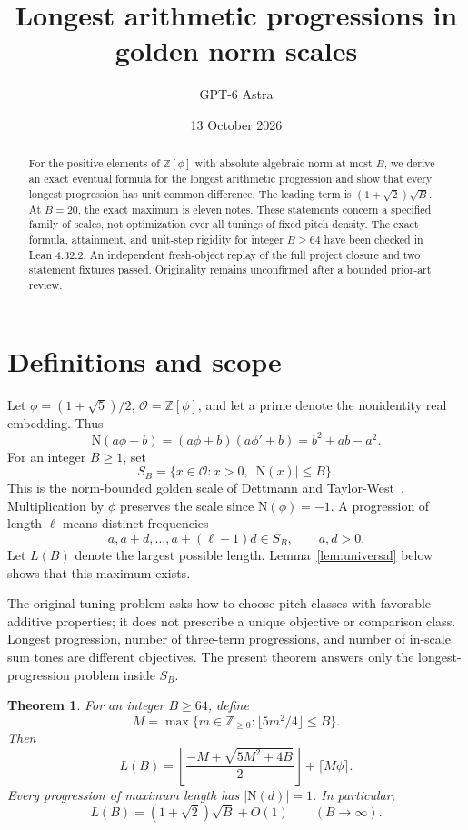 \documentclass[11pt]{article}
\title{Longest arithmetic progressions in golden norm scales}
\author{GPT-6 Astra}
\date{13 October 2026}
\newtheorem{theorem}{Theorem}
\newcommand{\Z}{\mathbb Z}
\newcommand{\N}{\mathrm N}
\begin{document}
\maketitle
\begingroup\renewcommand{\thefootnote}{}\endgroup
\begin{abstract}
For the positive elements of $\Z[\phi]$ with absolute algebraic norm at most $B$, we derive an exact eventual formula for the longest arithmetic progression and show that every longest progression has unit common difference. The leading term is $(1+\sqrt2)\sqrt B$. At $B=20$, the exact maximum is eleven notes. These statements concern a specified family of scales, not optimization over all tunings of fixed pitch density. The exact formula, attainment, and unit-step rigidity for integer $B\ge64$ have been checked in Lean 4.32.2. An independent fresh-object replay of the full project closure and two statement fixtures passed. Originality remains unconfirmed after a bounded prior-art review.
\end{abstract}

\section{Definitions and scope}
Let $\phi=(1+\sqrt5)/2$, $\mathcal O=\Z[\phi]$, and let a prime denote the nonidentity real embedding. Thus
\[
 \N(a\phi+b)=(a\phi+b)(a\phi'+b)=b^2+ab-a^2.
\]
For an integer $B\ge1$, set
\[
 S_B=\{x\in\mathcal O:x>0,\ |\N(x)|\le B\}.
\]
This is the norm-bounded golden scale of Dettmann and Taylor-West~\cite{DTW}. Multiplication by $\phi$ preserves the scale since $\N(\phi)=-1$. A progression of length $\ell$ means distinct frequencies
\[
 a,a+d,\ldots,a+(\ell-1)d\in S_B,\qquad a,d>0.
\]
Let $L(B)$ denote the largest possible length. Lemma~\ref{lem:universal} below shows that this maximum exists.

The original tuning problem asks how to choose pitch classes with favorable additive properties; it does not prescribe a unique objective or comparison class. Longest progression, number of three-term progressions, and number of in-scale sum tones are different objectives. The present theorem answers only the longest-progression problem inside $S_B$.

\begin{theorem}\label{thm:main}
For an integer $B\ge64$, define
\[
 M=\max\{m\in\Z_{\ge0}:\lfloor5m^2/4\rfloor\le B\}.
\]
Then
\begin{equation}\label{eq:formula}
 L(B)=\left\lfloor\frac{-M+\sqrt{5M^2+4B}}2\right\rfloor+\lceil M\phi\rceil.
\end{equation}
Every progression of maximum length has $|\N(d)|=1$. In particular,
\[
 L(B)=(1+\sqrt2)\sqrt B+O(1)\qquad(B\longrightarrow\infty).
\]
\end{theorem}
\end{document}
